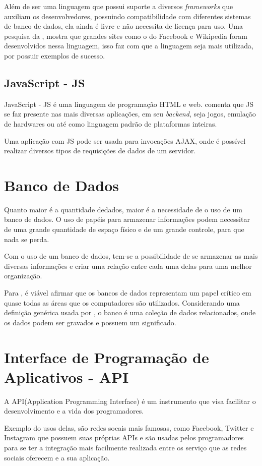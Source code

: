 Além de ser uma linguagem que possui suporte a diversos \textit{frameworks} que auxiliam os desenvolvedores, possuindo compatibilidade com diferentes sistemas de banco de dados, ela ainda é livre e não necessita de licença para uso. Uma pesquisa da \cite{phpusage2018}, mostra que grandes sites como o do Facebook e Wikipedia foram desenvolvidos nessa linguagem, isso faz com que a linguagem seja mais utilizada, por possuir exemplos de sucesso.

\subsection{JavaScript - JS}
JavaScript - JS é uma linguagem de programação HTML e web. \cite{balduino2014} comenta que JS se faz presente nas mais diversas aplicações, em seu \textit{backend}, seja jogos, emulação de hardwares ou até como linguagem padrão de plataformas inteiras.

Uma aplicação com JS pode ser usada para invocações AJAX, onde é possível realizar diversos tipos de requisições de dados de um servidor.

\section{Banco de Dados}
Quanto maior é a quantidade dedados, maior é a necessidade de o uso de um banco de dados. O uso de papéis para armazenar informações podem necessitar de uma grande quantidade de espaço físico e de um grande controle, para que nada se perda.

Com o uso de um banco de dados, tem-se a possibilidade de se armazenar as mais diversas informações e criar uma relação entre cada uma delas para uma melhor organização.

Para \cite{elmasri2005}, é viável afirmar que os bancos de dados representam um papel crítico em quase todas as áreas que os computadores são utilizados. Considerando uma definição genérica usada por \cite{elmasri2005}, o banco é uma coleção de dados relacionados, onde os dados podem ser gravados e possuem um significado.

\section{Interface de Programação de Aplicativos - API}
A API(Application Programming Interface) é um instrumento que visa facilitar o desenvolvimento e a vida dos programadores. 

Exemplo do usos delas, são redes socais mais famosas, como Facebook, Twitter e Instagram que possuem suas próprias APIs e são usadas pelos programadores para se ter a integração mais facilmente realizada entre os serviço que as redes sociais oferecem e a sua aplicação.

